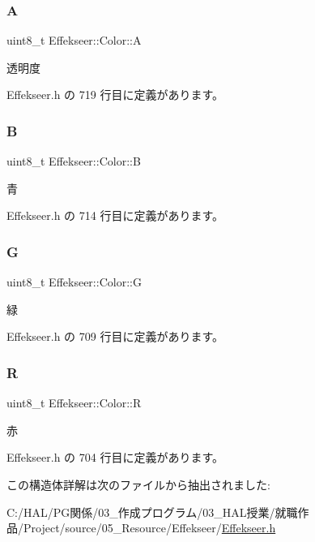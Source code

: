 \subsubsection{\texorpdfstring{A}{A}}
{\footnotesize\ttfamily uint8\+\_\+t Effekseer\+::\+Color\+::A}



透明度 



 Effekseer.\+h の 719 行目に定義があります。

\mbox{\label{struct_effekseer_1_1_color_a0313689224c549471daa2bfe58839d84}} 
\subsubsection{\texorpdfstring{B}{B}}
{\footnotesize\ttfamily uint8\+\_\+t Effekseer\+::\+Color\+::B}



青 



 Effekseer.\+h の 714 行目に定義があります。

\mbox{\label{struct_effekseer_1_1_color_a6d82d496ac86f8ac07ec0e8710126ef9}} 
\subsubsection{\texorpdfstring{G}{G}}
{\footnotesize\ttfamily uint8\+\_\+t Effekseer\+::\+Color\+::G}



緑 



 Effekseer.\+h の 709 行目に定義があります。

\mbox{\label{struct_effekseer_1_1_color_aae98e2323761b1b2b2d9d182e3af3b40}} 
\subsubsection{\texorpdfstring{R}{R}}
{\footnotesize\ttfamily uint8\+\_\+t Effekseer\+::\+Color\+::R}



赤 



 Effekseer.\+h の 704 行目に定義があります。



この構造体詳解は次のファイルから抽出されました\+:\begin{DoxyCompactItemize}
\item 
C\+:/\+H\+A\+L/\+P\+G関係/03\+\_\+作成プログラム/03\+\_\+\+H\+A\+L授業/就職作品/\+Project/source/05\+\_\+\+Resource/\+Effekseer/\mbox{\hyperlink{_effekseer_8h}{Effekseer.\+h}}\end{DoxyCompactItemize}
